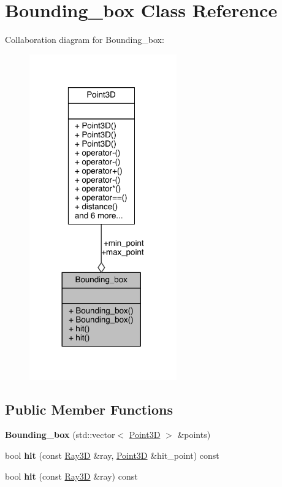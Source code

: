 \hypertarget{class_bounding__box}{}\section{Bounding\+\_\+box Class Reference}
\label{class_bounding__box}


Collaboration diagram for Bounding\+\_\+box\+:
\nopagebreak
\begin{figure}[H]
\begin{center}
\leavevmode
\includegraphics[width=180pt]{doxygen/latex/class_bounding__box__coll__graph}
\end{center}
\end{figure}
\subsection*{Public Member Functions}
\begin{DoxyCompactItemize}
\item 
\hypertarget{class_bounding__box_adf45c090850ee7b48b59f8e586450ef3}{}\label{class_bounding__box_adf45c090850ee7b48b59f8e586450ef3} 
{\bfseries Bounding\+\_\+box} (std\+::vector$<$ \hyperlink{class_point3_d}{Point3D} $>$ \&points)
\item 
\hypertarget{class_bounding__box_a29a6d043ac2de9fb152f39c1139e42df}{}\label{class_bounding__box_a29a6d043ac2de9fb152f39c1139e42df} 
bool {\bfseries hit} (const \hyperlink{class_ray3_d}{Ray3D} \&ray, \hyperlink{class_point3_d}{Point3D} \&hit\+\_\+point) const
\item 
\hypertarget{class_bounding__box_af2a1aa9cee9c82c2dd2df602cca9f42f}{}\label{class_bounding__box_af2a1aa9cee9c82c2dd2df602cca9f42f} 
bool {\bfseries hit} (const \hyperlink{class_ray3_d}{Ray3D} \&ray) const
\end{DoxyCompactItemize}
